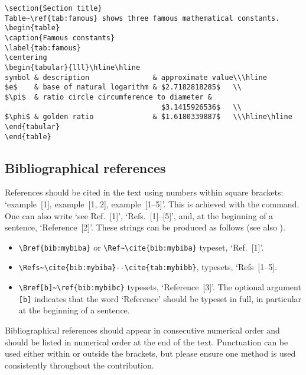 \documentclass{cernrep}
\begin{document}
\begin{verbatim}
\section{Section title}
Table~\ref{tab:famous} shows three famous mathematical constants.
\begin{table}
\caption{Famous constants}
\label{tab:famous}
\centering
\begin{tabular}{lll}\hline\hline
symbol & description               & approximate value\\\hline
$e$    & base of natural logarithm & $2.7182818285$   \\
$\pi$  & ratio circle circumference to diameter &
                                     $3.1415926536$   \\
$\phi$ & golden ratio              & $1.6180339887$   \\\hline\hline
\end{tabular}
\end{table}
\end{verbatim}

\subsection{Bibliographical references}
\label{sec:biblioref}

References should be cited in the text using numbers within square
brackets: `example~[1], example~[1, 2], example~[1--5]'. This is
achieved with the  command. One can also write `see
Ref.~[1]', `Refs.~[1]--[5]', and, at the beginning of a sentence,
`Reference~[2]'. These strings can be produced as follows (see also
).
\begin{itemize}
\item \verb!\Bref{bib:mybiba}! or \verb!\Ref~\cite{bib:mybiba}! 
      typeset, \eg `Ref.~[1]'.
\item \verb!\Refs~\cite{bib:mybiba}--\cite{tab:mybibb}!, 
      typesets, \eg `Refs~[1--5].
\item \verb!\Bref[b]~\ref{bib:mybibc}! typesets, \eg `Reference~[3]'.
       The optional argument \texttt{[b]} indicates that the word
       `Reference' should be typeset in full, in particular at the
       beginning of a sentence.
\end{itemize}

Bibliographical references should appear in consecutive numerical
order and should be listed in numerical order at the end of the
text. Punctuation can be used either within or outside the brackets,
but please ensure one method is used consistently throughout the
contribution.
\end{document}
